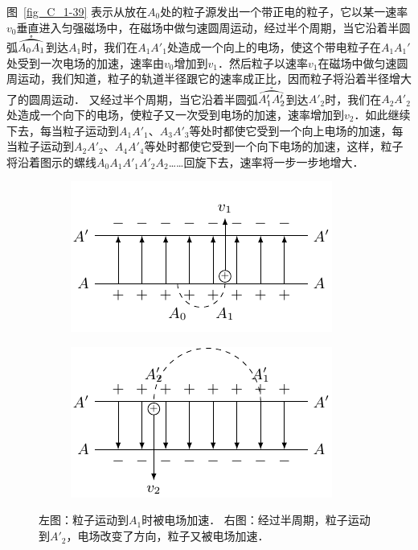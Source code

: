 图~\ref{fig_C_1-39} 表示从放在$A_0$处的粒子源发出一个带正电的粒子，它以某一速率$v_0$垂直进入匀强磁场中，在磁场中做匀速圆周运动，经过半个周期，当它沿着半圆弧$\widering{A_0A_1}$到达$A_1$时，我们在$A_1A'_1$处造成一个向上的电场，使这个带电粒子在$A_1A_1'$处受到一次电场的加速，速率由$v_0$增加到$v_1$．然后粒子以速率$v_1$在磁场中做匀速圆周运动，我们知道，粒子的轨道半径跟它的速率成正比，因而粒子将沿着半径增大了的圆周运动．
又经过半个周期，当它沿着半圆弧$\widering{A'_1A'_2}$到达$A'_2$时，我们在$A_2A'_2$处造成一个向下的电场，使粒子又一次受到电场的加速，速率增加到$v_2$．如此继续下去，每当粒子运动到$A_1A'_1$、$A_3A'_3$等处时都使它受到一个向上电场的加速，每当粒子运动到$A_2A'_2$、$A_4A'_4$等处时都使它受到一个向下电场的加速，这样，粒子将沿着图示的螺线$A_0A_1A'_1A'_2A_2$……回旋下去，速率将一步一步地增大．
\begin{figure}[htbp]
    \centering
    \begin{subfigure}{0.4\linewidth}
        \centering
        \includegraphics{fig/C/1-40a.pdf}
        \caption{}\label{fig_C_1-40a}
    \end{subfigure}
    \hfil
    \begin{subfigure}{0.4\linewidth}
        \centering
        \includegraphics{fig/C/1-40b.pdf}
        \caption{}\label{fig_C_1-40b}
    \end{subfigure}
    \caption{左图：粒子运动到$A_1$时被电场加速．
            右图：经过半周期，粒子运动到$A'_2$，电场改变了方向，粒子又被电场加速．}\label{fig_C_1-40}
\end{figure}

